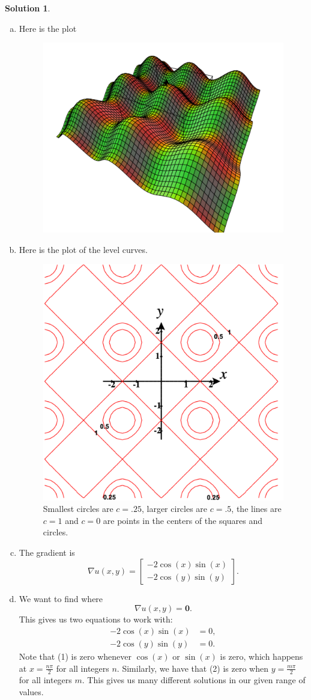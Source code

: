 \documentclass[12pt]{report} %
\theoremstyle{definition}
\newtheorem{solution}{Solution}
\begin{document}
\begin{solution}~
\begin{enumerate}[(a)]
    \item Here is the plot
    \begin{figure}[H]
        \centering
        \includegraphics[width=.6\textwidth]{Images/crystal.png}
    \end{figure}
    
    \item Here is the plot of the level curves.
    \begin{figure}[H]
        \centering
        \includegraphics[width=.6\textwidth]{Images/crystal_contour.png}
        \caption{Smallest circles are $c=.25$, larger circles are $c=.5$, the lines are $c=1$ and $c=0$ are points in the centers of the squares and circles.}
        \label{fig:my_label}
    \end{figure}
    
    \item The gradient is
    \[
    \nabla u(x,y) = \begin{bmatrix} -2\cos(x)\sin(x) \\ -2\cos(y)\sin(y) \end{bmatrix}.
    \]
    \item We want to find where
    \[
    \nabla u(x,y) = \mathbf{0}.
    \]
    This gives us two equations to work with:
    \begin{align}
        -2\cos(x)\sin(x) &= 0,\\
        -2\cos(y)\sin(y) &= 0.
    \end{align}
    Note that (1) is zero whenever $\cos(x)$ or $\sin(x)$ is zero, which happens at $x=\frac{n\pi}{2}$ for all integers $n$. Similarly, we have that (2) is zero when $y=\frac{m\pi}{2}$ for all integers $m$.  This gives us many different solutions in our given range of values.
    

\end{enumerate}
\end{solution}
\end{document}

